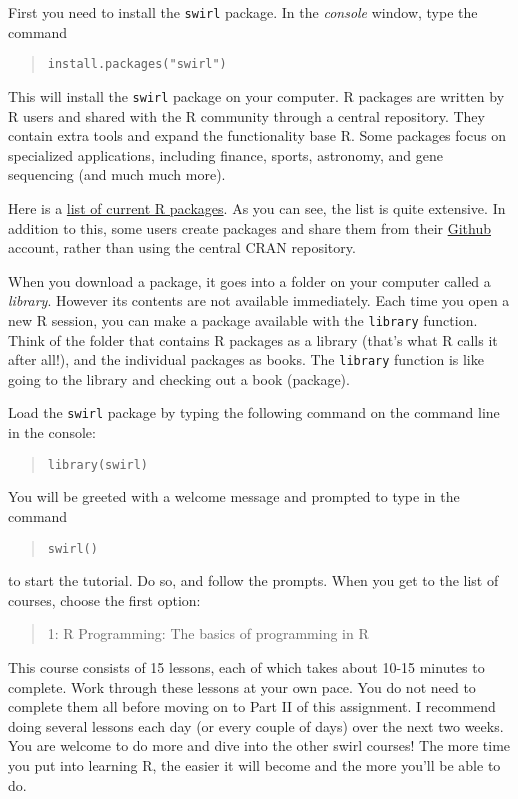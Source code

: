 \documentclass[
]{article}
\begin{document}
First you need to install the \texttt{swirl} package. In the
\emph{console} window, type the command

\begin{quote}
\texttt{install.packages("swirl")}
\end{quote}

This will install the \texttt{swirl} package on your computer. R
packages are written by R users and shared with the R community through
a central repository. They contain extra tools and expand the
functionality base R. Some packages focus on specialized applications,
including finance, sports, astronomy, and gene sequencing (and much much
more).

Here is a
\href{https://cran.r-project.org/web/packages/available_packages_by_name.html}{list
of current R packages}. As you can see, the list is quite extensive. In
addition to this, some users create packages and share them from their
\href{https://github.com}{Github} account, rather than using the central
CRAN repository.

When you download a package, it goes into a folder on your computer
called a \emph{library}. However its contents are not available
immediately. Each time you open a new R session, you can make a package
available with the \texttt{library} function. Think of the folder that
contains R packages as a library (that's what R calls it after all!),
and the individual packages as books. The \texttt{library} function is
like going to the library and checking out a book (package).

Load the \texttt{swirl} package by typing the following command on the
command line in the console:

\begin{quote}
\texttt{library(swirl)}
\end{quote}

You will be greeted with a welcome message and prompted to type in the
command

\begin{quote}
\texttt{swirl()}
\end{quote}

to start the tutorial. Do so, and follow the prompts. When you get to
the list of courses, choose the first option:

\begin{quote}
1: R Programming: The basics of programming in R
\end{quote}

This course consists of 15 lessons, each of which takes about 10-15
minutes to complete. Work through these lessons at your own pace. You do
not need to complete them all before moving on to Part II of this
assignment. I recommend doing several lessons each day (or every couple
of days) over the next two weeks. You are welcome to do more and dive
into the other swirl courses! The more time you put into learning R, the
easier it will become and the more you'll be able to do.
\end{document}
